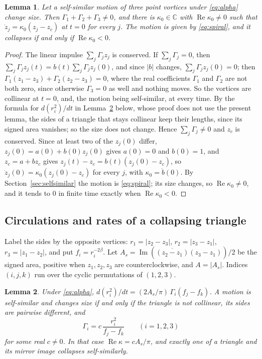\documentclass[11pt]{article}
\newtheorem{lemma}{Lemma}
\theoremstyle{definition}
\newcommand{\re}{\operatorname{Re}}
\newcommand{\im}{\operatorname{Im}}
\newcommand{\C}{\mathbb{C}}
\begin{document}
\begin{lemma}\label{lem:ss}
Let a self-similar motion of three point vortices under \eqref{eq:alpha} change size. Then $\Gamma_1 + \Gamma_2 + \Gamma_3 \ne 0$, and there is $\kappa_0 \in \C$ with $\re\kappa_0 \ne 0$ such that $\dot z_j = \kappa_0 (z_j - z_c)$ at $t = 0$ for every $j$. The motion is given by \eqref{eq:spiral}, and it collapses if and only if $\re\kappa_0 < 0$.
\end{lemma}

\begin{proof}
The linear impulse $\sum_j \Gamma_j z_j$ is conserved. If $\sum_j \Gamma_j = 0$, then $\sum_j \Gamma_j z_j(t) = b(t) \sum_j \Gamma_j z_j(0)$, and since $|b|$ changes, $\sum_j \Gamma_j z_j(0) = 0$; then $\Gamma_1(z_1 - z_3) + \Gamma_2(z_2 - z_3) = 0$, where the real coefficients $\Gamma_1$ and $\Gamma_2$ are not both zero, since otherwise $\Gamma_3 = 0$ as well and nothing moves. So the vortices are collinear at $t = 0$, and, the motion being self-similar, at every time. By the formula for $d(r_i^2)/dt$ in Lemma~\ref{lem:circalpha} below, whose proof does not use the present lemma, the sides of a triangle that stays collinear keep their lengths, since its signed area vanishes; so the size does not change. Hence $\sum_j \Gamma_j \ne 0$ and $z_c$ is conserved. Since at least two of the $z_j(0)$ differ, $z_j(0) = a(0) + b(0)z_j(0)$ gives $a(0) = 0$ and $b(0) = 1$, and $z_c = a + b z_c$ gives $z_j(t) - z_c = b(t)(z_j(0) - z_c)$, so $\dot z_j(0) = \kappa_0 (z_j(0) - z_c)$ for every $j$, with $\kappa_0 = \dot b(0)$. By Section~\ref{sec:selfsimilar} the motion is \eqref{eq:spiral}; its size changes, so $\re\kappa_0 \ne 0$, and it tends to $0$ in finite time exactly when $\re\kappa_0 < 0$.
\end{proof}

\subsection{Circulations and rates of a collapsing triangle}\label{sec:rates}

Label the sides by the opposite vertices: $r_1 = |z_2 - z_3|$, $r_2 = |z_3 - z_1|$, $r_3 = |z_1 - z_2|$, and put $f_i = r_i^{-2\beta}$. Let $A_s = \im(\overline{(z_2 - z_1)}(z_3 - z_1))/2$ be the signed area, positive when $z_1, z_2, z_3$ are counterclockwise, and $A = |A_s|$. Indices $(i, j, k)$ run over the cyclic permutations of $(1, 2, 3)$.

\begin{lemma}\label{lem:circalpha}
Under \eqref{eq:alpha}, $d(r_i^2)/dt = (2A_s/\pi)\,\Gamma_i (f_j - f_k)$. A motion is self-similar and changes size if and only if the triangle is not collinear, its sides are pairwise different, and
\begin{equation}\label{eq:circalpha}
\Gamma_i = c\, \frac{r_i^2}{f_j - f_k} \qquad (i = 1, 2, 3)
\end{equation}
for some real $c \ne 0$. In that case $\re\kappa = cA_s/\pi$, and exactly one of a triangle and its mirror image collapses self-similarly.
\end{lemma}
\end{document}
